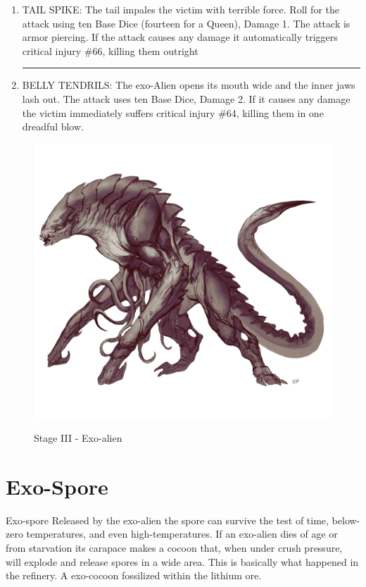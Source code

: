 \begin{rpg-commentbox}{}
\begin{small}
\begin{enumerate}
        \par\noindent\rule{.9\textwidth}{0.4pt}

        \item TAIL SPIKE: The tail impales the victim with terrible force. Roll for the attack using ten Base
        Dice (fourteen for a Queen), Damage 1. The attack is armor piercing. If the attack causes
        any damage it automatically triggers critical injury \#66, killing them outright

        \par\noindent\rule{.9\textwidth}{0.4pt}


        \item BELLY TENDRILS: The exo-Alien opens its mouth wide and the inner jaws lash out. The attack uses
        ten Base Dice, Damage 2. If it causes any damage the victim immediately suffers critical
        injury \#64, killing them in one dreadful blow.
    \end{enumerate}
    \end{small}

\end{rpg-commentbox}


\begin{figure}
    \centering
    \includegraphics[width=.6\textwidth]{img/stage-III-bg.png}
    \label{fig:stage-3}
    \caption*{Stage III - Exo-alien}
\end{figure}


\section{Exo-Spore}

\begin{rpg-commentbox}{Exo-spore}
    Released by the exo-alien the spore can survive the test of time, below-zero temperatures, and even high-temperatures. If an exo-alien dies of age or from starvation its carapace makes a cocoon that, when under crush pressure, will explode and release spores in a wide area. This is basically what happened in the refinery. A exo-cocoon fossilized within the lithium ore.
\end{rpg-commentbox}